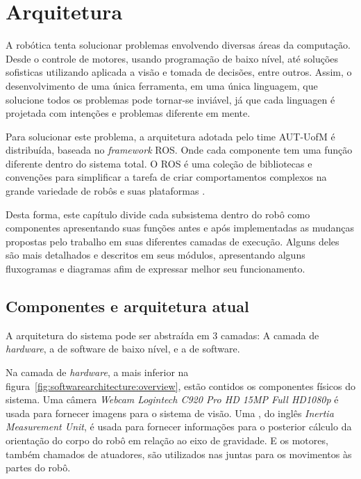 \chapter{Arquitetura}
\label{ch:architecture}

A robótica tenta solucionar problemas envolvendo diversas áreas da computação. Desde o controle de motores, usando programação de baixo nível, até soluções sofisticas utilizando  aplicada a visão e tomada de decisões, entre outros. Assim, o desenvolvimento de uma única ferramenta, em uma única linguagem, que solucione todos os problemas pode tornar-se inviável, já que cada linguagen é projetada com intenções e problemas diferente em mente.

Para solucionar este problema, a arquitetura adotada pelo time AUT-UofM é distribuída, baseada no \textit{framework} ROS. Onde cada componente tem uma função diferente dentro do sistema total. O ROS é uma coleção de bibliotecas e convenções para simplificar a tarefa de criar comportamentos complexos na grande variedade de robôs e suas plataformas \cite{ros2017}.

Desta forma, este capítulo divide cada subsistema dentro do robô como componentes apresentando suas funções antes e após implementadas as mudanças propostas pelo trabalho em suas diferentes camadas de execução. Alguns deles são mais detalhados e descritos em seus módulos, apresentando alguns fluxogramas e diagramas afim de expressar melhor seu funcionamento.

\section{Componentes e arquitetura atual}
\label{sec:architecture:current_components_and_architecture}

A arquitetura do sistema pode ser abstraída em $3$ camadas: A camada de \textit{hardware}, a de software de baixo nível, e a de software.

Na camada de \textit{hardware}, a mais inferior na figura~\ref{fig:softwarearchitecture:overview}, estão contidos os componentes físicos do sistema. Uma câmera \textit{Webcam Logintech C920 Pro HD 15MP Full HD1080p} é usada para fornecer imagens para o sistema de visão. Uma , do inglês \textit{Inertia Measurement Unit}, é usada para fornecer informações para o posterior cálculo da orientação do corpo do robô em relação ao eixo de gravidade. E os motores, também chamados de atuadores, são utilizados nas juntas para os movimentos às partes do robô.

